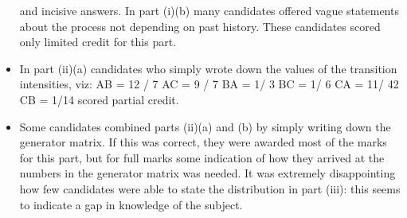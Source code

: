 \documentclass[a4paper,12pt]{article}
\begin{document}
\begin{itemize}
and incisive answers. In part (i)(b) many candidates offered vague statements about the process not depending on past history. These candidates scored only limited credit for this
part. 
\item In part (ii)(a) candidates who simply wrote down the values of the transition intensities,
viz:
\mu AB = 12 / 7
\mu AC = 9 / 7
\mu BA = 1/ 3
\mu BC = 1/ 6
\mu CA = 11/ 42
\mu CB = 1/14
scored partial credit. 
\item Some candidates combined parts (ii)(a) and (b) by simply writing down
the generator matrix. If this was correct, they were awarded most of the marks for this part,
but for full marks some indication of how they arrived at the numbers in the generator matrix
was needed. It was extremely disappointing how few candidates were able to state the
distribution in part (iii): this seems to indicate a gap in knowledge of the subject.
\end{itemize}
\end{document}
